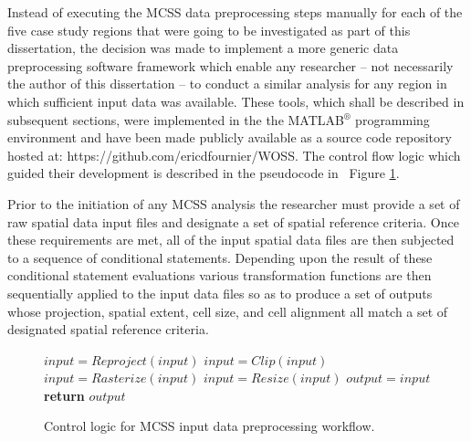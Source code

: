 Instead of executing the MCSS data preprocessing steps manually for each of the five case study regions that were going to be investigated as part of this dissertation, the decision was made to implement a more generic data preprocessing software framework which enable any researcher -- not necessarily the author of this dissertation --  to conduct a similar analysis for any region in which sufficient input data was available. These tools, which shall be described in subsequent sections, were implemented in the the MATLAB$^{\circledR}$ programming environment and have been made publicly available as a source code repository hosted at: https://github.com/ericdfournier/WOSS. The control flow logic which guided their development is described in the pseudocode in ~Figure \ref{fig:Pseudocode}.

Prior to the initiation of any MCSS analysis the researcher must provide a set of raw spatial data input files and designate a set of spatial reference criteria. Once these requirements are met, all of the input spatial data files are then subjected to a sequence of conditional statements. Depending upon the result of these conditional statement evaluations various transformation functions are then sequentially applied to the input data files so as to produce a set of outputs whose projection, spatial extent, cell size, and cell alignment all match a set of designated spatial reference criteria.

        \begin{figure}[!h]
        \begin{centering}
        \label{euclid}
            \begin{algorithmic}[1]
            
                            \State $input = Reproject(input)$
                            \State $input = Clip(input)$
                            \State $input = Rasterize(input)$
                            \State $input = Resize(input)$
                        \EndIf
                        \State $output = input$
                    \EndFor
                    \State \textbf{return} $output$
                    
                \EndProcedure
            \end{algorithmic}
        \end{centering}
        \caption{Control logic for MCSS input data preprocessing workflow.}
        \label{fig:Pseudocode}
        \end{figure}
            
